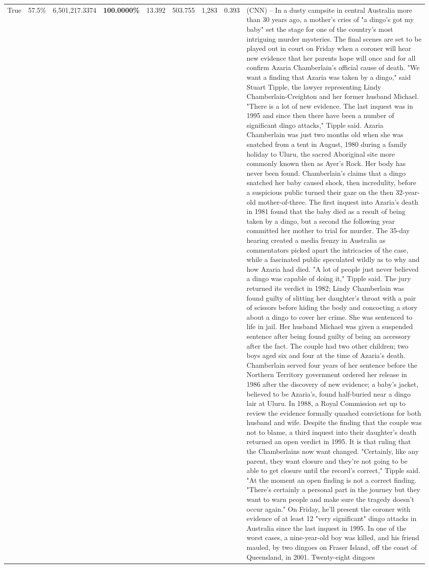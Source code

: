 \begin{table}[H]
\begin{tabular}{lllrlllll}
True & 57.5\% & 6,501,217.3374 & \bfseries \color{red} 100.0000\% & 13.392 & 503.755 & 1,283 & 0.393 & (CNN) -- In a dusty campsite in central Australia more than 30 years ago, a mother's cries of "a dingo's got my baby" set the stage for one of the country's most intriguing murder mysteries. The final scenes are set to be played out in court on Friday when a coroner will hear new evidence that her parents hope will once and for all confirm Azaria Chamberlain's official cause of death. "We want a finding that Azaria was taken by a dingo," said Stuart Tipple, the lawyer representing Lindy Chamberlain-Creighton and her former husband Michael. "There is a lot of new evidence. The last inquest was in 1995 and since then there have been a number of significant dingo attacks," Tipple said. Azaria Chamberlain was just two months old when she was snatched from a tent in August, 1980 during a family holiday to Uluru, the sacred Aboriginal site more commonly known then as Ayer's Rock. Her body has never been found. Chamberlain's claims that a dingo snatched her baby caused shock, then incredulity, before a suspicious public turned their gaze on the then 32-year-old mother-of-three. The first inquest into Azaria's death in 1981 found that the baby died as a result of being taken by a dingo, but a second the following year committed her mother to trial for murder. The 35-day hearing created a media frenzy in Australia as commentators picked apart the intricacies of the case, while a fascinated public speculated wildly as to why and how Azaria had died. "A lot of people just never believed a dingo was capable of doing it," Tipple said. The jury returned its verdict in 1982; Lindy Chamberlain was found guilty of slitting her daughter's throat with a pair of scissors before hiding the body and concocting a story about a dingo to cover her crime. She was sentenced to life in jail. Her husband Michael was given a suspended sentence after being found guilty of being an accessory after the fact. The couple had two other children; two boys aged six and four at the time of Azaria's death. Chamberlain served four years of her sentence before the Northern Territory government ordered her release in 1986 after the discovery of new evidence; a baby's jacket, believed to be Azaria's, found half-buried near a dingo lair at Uluru. In 1988, a Royal Commission set up to review the evidence formally quashed convictions for both husband and wife. Despite the finding that the couple was not to blame, a third inquest into their daughter's death returned an open verdict in 1995. It is that ruling that the Chamberlains now want changed. "Certainly, like any parent, they want closure and they're not going to be able to get closure until the record's correct," Tipple said. "At the moment an open finding is not a correct finding. "There's certainly a personal part in the journey but they want to warn people and make sure the tragedy doesn't occur again." On Friday, he'll present the coroner with evidence of at least 12 "very significant" dingo attacks in Australia since the last inquest in 1995. In one of the worst cases, a nine-year-old boy was killed, and his friend mauled, by two dingoes on Fraser Island, off the coast of Queensland, in 2001. Twenty-eight dingoes 
\end{tabular}
\end{table}
